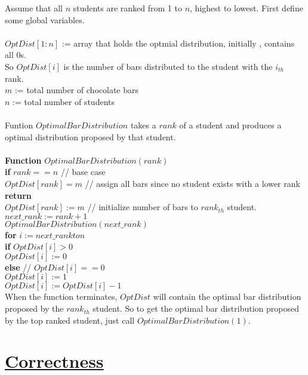 \documentclass[11pt]{article}
\begin{document}
Assume that all $n$ students are ranked from 1 to $n$, highest to
lowest. First define some global variables.\\\\ 
$OptDist[1:n]$ := array that holds the optmial distribution, initially
, contains all 0s.\\
So $OptDist[i]$ is the number of bars distributed to the student with
the $i_{th}$ rank.\\
$m$ := total number of chocolate bars\\
$n$ := total number of students\\\\
Funtion $OptimalBarDistribution$ takes a $rank$ of a student
and produces a optimal distribution proposed by that student.\\\\
\textbf{Function} $OptimalBarDistribution( rank )$\\
\-\hspace{2em} \textbf{if} $rank == n$ // base case \\
\-\hspace{4em} $OptDist[rank] = m$ // assign all bars since no student
exists with a lower rank \\
\-\hspace{4em} \textbf{return}\\
\-\hspace{2em} $OptDist[rank] := m$ // initialize number of bars to
$rank_{th}$ student.\\
\-\hspace{2em} $next\_rank := rank+1$\\
\-\hspace{2em} $OptimalBarDistribution( next\_rank )$\\
\-\hspace{2em} \textbf{for} $i := next\_rank to n$\\
\-\hspace{4em} \textbf{if} $OptDist[i] > 0$\\
\-\hspace{6em} $OptDist[i] := 0$\\
\-\hspace{4em} \textbf{else} // $OptDist[i] == 0$\\
\-\hspace{6em} $OptDist[i] := 1$\\
\-\hspace{6em} $OptDist[i] := OptDist[i] - 1$\\

When the function terminates, $OptDist$ will contain the optimal bar
distribution proposed by the $rank_{th}$ student. So to get the
optimal bar distribution proposed by the top ranked student, just call
$OptimalBarDistribution(1)$.

\section*{\underline{Correctness}}
\end{document}
